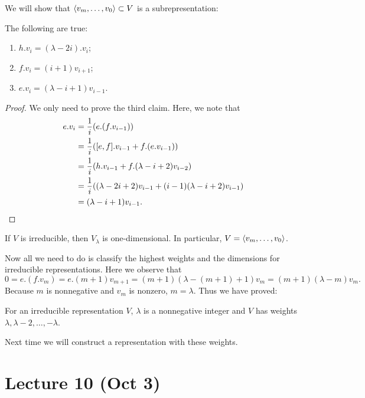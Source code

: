 \documentclass[twoside, 10pt]{article}
\begin{document}
    We will show that $\langle v_m, \ldots, v_0\rangle \subset V$ is a subrepresentation:

    \begin{prop}
        The following are true:
        \begin{enumerate}
            \item $h.v_i = (\lambda - 2i).v_i$;
            \item $f.v_i = (i+1)v_{i+1}$;
            \item $e.v_i = (\lambda - i+1)v_{i-1}$.
        \end{enumerate}
    \end{prop}

    \begin{proof}
        We only need to prove the third claim. Here, we note that
        \begin{align*}
            e.v_i &= \frac{1}{i}(e.(f.v_{i-1})) \\
            &= \frac{1}{i} ([e,f].v_{i-1} + f.(e.v_{i-1}))\\ 
            &= \frac{1}{i} (h.v_{i-1} + f.(\lambda-i+2)v_{i-2}) \\
            &= \frac{1}{i} ((\lambda -2i+2) v_{i-1} + (i-1)(\lambda -i + 2) v_{i-1}) \\
            &= (\lambda -i + 1) v_{i-1}. \qedhere
        \end{align*}
    \end{proof}

    \begin{cor}
        If $V$ is irreducible, then $V_{\lambda}$ is one-dimensional. In particular, $V = \langle v_m, \ldots, v_0\rangle$.
    \end{cor}

    Now all we need to do is classify the highest weights and the dimensions for irreducible representations. Here we observe that
    \[0 = e.(f.v_m) = e.(m+1)v_{m+1} = (m+1)(\lambda - (m+1)+1)v_m = (m+1)(\lambda - m)v_m.\] Because $m$ is nonnegative and $v_m$ is nonzero, $m = \lambda$. Thus we have proved:

    \begin{thm}
        For an irreducible representation $V$, $\lambda$ is a nonnegative integer and $V$ has weights $\lambda, \lambda - 2, \ldots, -\lambda$.
    \end{thm}

    Next time we will construct a representation with these weights.

    \section{Lecture 10 (Oct 3)}%
    \label{sec:lecture_10_oct_3_}
\end{document}
